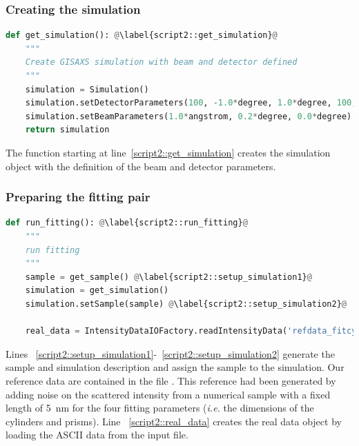 \subsubsection*{Creating the simulation}
\begin{lstlisting}[language=python, style=eclipseboxed, firstnumber=35]
def get_simulation(): @\label{script2::get_simulation}@
    """
    Create GISAXS simulation with beam and detector defined
    """
    simulation = Simulation()
    simulation.setDetectorParameters(100, -1.0*degree, 1.0*degree, 100, 0.0*degree, 2.0*degree)
    simulation.setBeamParameters(1.0*angstrom, 0.2*degree, 0.0*degree)
    return simulation
\end{lstlisting}
The function starting at line~\ref{script2::get_simulation} creates
the simulation object with the definition of the beam and detector parameters.

\subsubsection*{Preparing the fitting pair}
\begin{lstlisting}[language=python, style=eclipseboxed, firstnumber=45]
def run_fitting(): @\label{script2::run_fitting}@
    """
    run fitting
    """
    sample = get_sample() @\label{script2::setup_simulation1}@
    simulation = get_simulation()
    simulation.setSample(sample) @\label{script2::setup_simulation2}@

    real_data = IntensityDataIOFactory.readIntensityData('refdata_fitcylinderprisms.int.gz') @\label{script2::real_data}@
\end{lstlisting}
Lines
~\ref{script2::setup_simulation1}-~\ref{script2::setup_simulation2}
generate the 
sample and simulation description and assign the sample to the simulation.
Our reference data are contained in the file .
 This reference had been generated by adding noise
on the scattered intensity from a numerical sample with a fixed length of 5~nm for the four fitting
parameters (\textit{i.e.} the dimensions of the cylinders and prisms).
Line ~\ref{script2::real_data} creates the real data object by loading
the ASCII data from the input file.

